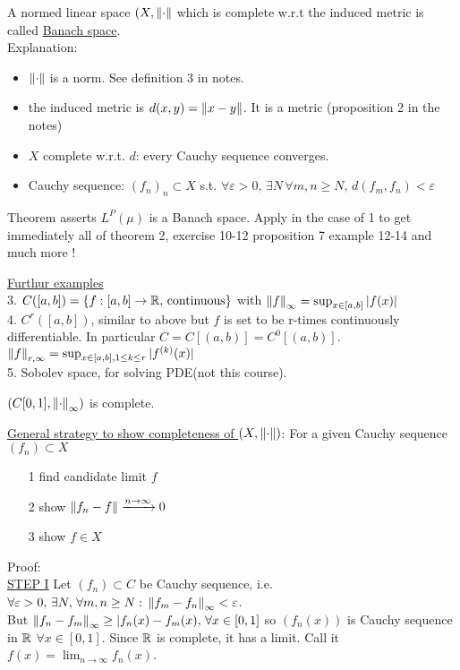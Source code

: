 \documentclass{article}
\begin{document}
\begin{definition}
	A normed linear space $(X,\left\|{\cdot}\right\|$ which is complete w.r.t the induced metric is called \underline{Banach space}.\\
	Explanation:
	\begin{itemize}
		\item $\left\|{\cdot}\right\|$ is a norm. See definition 3 in notes.
		\item the induced metric is $d(x,y)=\left\|{x-y}\right\|$. It is a metric (proposition 2 in the notes) %
		\item $X$ complete w.r.t. $d$: every Cauchy sequence converges.
		\item Cauchy sequence: $(f_n)_n\subset X$ s.t. $\forall \varepsilon>0,\,\exists N\,\forall m,n\geq N,\,d(f_m,f_n)<\varepsilon$
	\end{itemize}
\end{definition}

\begin{remark}
	Theorem asserts $L^P(\mu)$ is a Banach space. Apply in the case of 1 to get immediately all of theorem 2, exercise 10-12 proposition 7 example 12-14 and much more
	!

\end{remark}

\underline{Furthur examples}\\
3. $C([a,b])=\{f:[a,b]\to\mathbb{R},\,\text{continuous}\}$ with $\left\|{f}\right\|_\infty=\sup_{x\in[a,b]}|f(x)|$\\
4. $C^r([a,b])$, similar to above but $f$ is set to be r-times continuously differentiable. In particular $C=C[(a,b)]=C^0[(a,b)]$.  $\left\|{f}\right\|_{r,\infty}=\sup_{x\in[a,b],1\leq k\leq r}|f^{(k)}(x)|$\\
5. Sobolev space, for solving PDE(not this course).

\begin{proposition}
	$(C[0,1],\left\|{\cdot}\right\|_\infty)$ is complete.
\end{proposition}
\underline{General strategy to show completeness of  $(X,\left\|{\cdot}\right\|)$}: For a given Cauchy sequence $(f_n)\subset X$
\begin{itemize}
	\item [1] find candidate limit $f$
	\item [2] show $\left\|{f_n-f}\right\|\xrightarrow{n\to\infty}0$
	\item [3] show $f\in X$
\end{itemize}

Proof: \\
\underline{STEP I}  Let $(f_n)\subset C$ be Cauchy sequence, i.e. $\forall \varepsilon>0,\,\exists N,\,\forall m,n\geq N:\,\left\|{f_m-f_n}\right\|_\infty<\varepsilon$.\\
But $\left\|{f_n-f_m}\right\|_\infty\geq|f_n(x)-f_m(x),\,\forall x\in[0,1]$ so $\left(f_n(x)\right)$ is Cauchy sequence in $\mathbb{R}$ $\forall  x\in[0,1]$. Since $\mathbb{R}$ is complete, it has a limit. Call it $f(x)=\lim_{n\to\infty}f_n(x)$.\\
\end{document}
